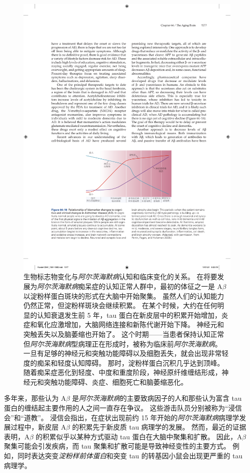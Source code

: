 \begin{figure}[htbp]
	\centering
	\includegraphics[width=0.75\linewidth]{chap64/fig_64_16}
	\caption{生物标志物变化与\textit{阿尔茨海默病}认知和临床变化的关系。
		在将要发展为\textit{阿尔茨海默病}痴呆症的认知正常人群中，最初的体征之一是 A$\beta$ 以淀粉样蛋白斑块的形式在大脑中开始聚集。
		虽然人们的认知能力仍然正常，但淀粉样斑块会继续积累。
		在某个时候，大约在任何明显的认知衰退发生前 5 年，tau 蛋白在新皮层中的积累开始增加，炎症和氧化应激增加，大脑网络连接和新陈代谢开始下降。
		神经元和突触丢失以及脑萎缩也开始了。
		这个时期——当患者保持认知正常但\textit{阿尔茨海默病}型病理正在形成时，被称为临床前\textit{阿尔茨海默病}。
		一旦有足够的神经元和突触功能障碍以及细胞丢失，就会出现非常轻度的痴呆和轻度认知障碍。
		那时，淀粉样蛋白沉积几乎达到顶峰。
		随着痴呆症恶化到轻度、中度和重度阶段，神经原纤维缠结形成，神经元和突触功能障碍、炎症、细胞死亡和脑萎缩恶化\cite{perrin2009multimodal}。}
	\label{fig:64_16}
\end{figure}


多年来，那些认为 A$\beta$ 是\textit{阿尔茨海默病}的主要致病因子的人和那些认为富含 tau 蛋白的缠结起主要作用的人之间一直存在争议。
这些游击队员分别被称为“浸信会”和“道教”。
浸信会指出，在症状出现前约 15 年开始的\textit{阿尔茨海默病}病理学发展过程中，新皮层 A$\beta$ 的积累先于新皮质 tau 病理学的发展。
然而，最近的证据表明，A$\beta$ 的积累似乎以某种方式驱动 tau 蛋白在大脑中聚集和扩散。
因此，A$\beta$ 聚集可能会引发疾病，而 tau 聚集和扩散可能是导致神经变性的主要方式。
例如，同时表达突变\textit{淀粉样前体蛋白}和突变 tau 的转基因小鼠会出现更严重的 tau 病理学。


